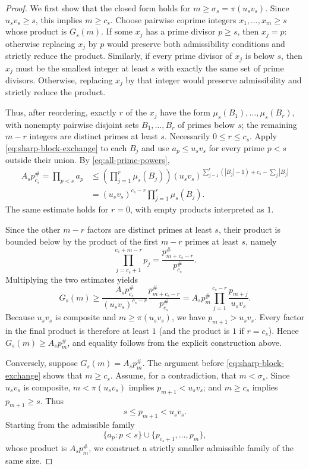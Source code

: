 \documentclass[11pt,onecolumn]{IEEEtran}
\newcommand{\primorial}[1]{p_{#1}^{\#}}
\begin{document}
\begin{proof}
We first show that the closed form holds for
$m\ge\sigma_s=\pi(u_sv_s)$.  Since
$u_sv_s\ge s$, this implies $m\ge c_s$.
Choose pairwise coprime integers $x_1,\ldots,x_m\ge s$
whose product is $G_s(m)$.  If some $x_j$ has a prime
divisor $p\ge s$, then $x_j=p$: otherwise replacing $x_j$
by $p$ would preserve both admissibility conditions and
strictly reduce the product.  Similarly, if every prime divisor of $x_j$ is below $s$, then $x_j$ must be the smallest integer at least $s$ with exactly the same set of prime divisors. Otherwise, replacing $x_j$ by that integer would preserve admissibility and strictly reduce the product.

Thus, after reordering, exactly $r$ of the $x_j$ have the
form $\mu_s(B_1),\ldots,\mu_s(B_r)$, with nonempty pairwise
disjoint sets $B_1,\ldots,B_r$ of primes below $s$;
the remaining $m-r$ integers are distinct primes at least
$s$.  Necessarily $0\le r\le c_s$.  Apply
\eqref{eq:sharp-block-exchange} to each $B_j$ and use
$a_p\le u_sv_s$ for every prime $p<s$ outside their union.
By \eqref{eq:all-prime-powers},
\[
\begin{aligned}
A_s\primorial{c_s}
=\prod_{p<s}a_p
&\le\left(\prod_{j=1}^r\mu_s(B_j)\right)
(u_sv_s)^{\sum_{j=1}^r(|B_j|-1)+c_s-\sum_j|B_j|}\\
&=(u_sv_s)^{c_s-r}\prod_{j=1}^r\mu_s(B_j).
\end{aligned}
\]
The same estimate holds for $r=0$, with empty products
interpreted as $1$.

Since the other $m-r$ factors are distinct primes at least
$s$, their product is bounded below by the product of the
first $m-r$ primes at least $s$, namely
\[
 \prod_{j=c_s+1}^{c_s+m-r}p_j
 =\frac{\primorial{m+c_s-r}}{\primorial{c_s}}.
\]
Multiplying the two estimates yields
\begin{equation}
 G_s(m)\ge\frac{A_s\primorial{c_s}}{(u_sv_s)^{c_s-r}}
       \frac{\primorial{m+c_s-r}}{\primorial{c_s}}=A_s\primorial{m}
       \prod_{j=1}^{c_s-r}\frac{p_{m+j}}{u_sv_s}.
 \label{eq:G-threshold-lower}
\end{equation}
Because $u_sv_s$ is composite and
$m\ge\pi(u_sv_s)$, we have $p_{m+1}>u_sv_s$.
Every factor in the final product is therefore at least
$1$ (and the product is $1$ if $r=c_s$).
Hence $G_s(m)\ge A_s\primorial{m}$, and equality follows
from the explicit construction above.

Conversely, suppose $G_s(m)=A_s\primorial{m}$.  The argument before
\eqref{eq:sharp-block-exchange} shows that $m\ge c_s$.
Assume, for a contradiction, that $m<\sigma_s$.  Since
$u_sv_s$ is composite, $m<\pi(u_sv_s)$ implies
$p_{m+1}<u_sv_s$; and $m\ge c_s$ implies $p_{m+1}\ge s$.
Thus
\[
s\le p_{m+1}<u_sv_s.
\]
Starting from the admissible family
\[
 \{a_p:p<s\}\cup\{p_{c_s+1},\ldots,p_m\},
\]
whose product is $A_s\primorial{m}$, we construct a
strictly smaller admissible family of the same size.


\end{proof}
\end{document}
